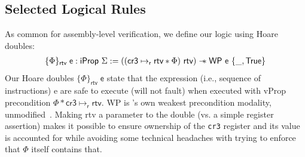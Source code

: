 \subsection{Selected Logical Rules}
\label{sec:selected_rules}
As common for assembly-level verification, we define our logic using Hoare doubles:%
  \[
  \begin{array}{l}
    \{ \Phi \}_\mathsf{ rtv }\;\textsf{e} : \textsf{iProp }\Sigma := 
   ((\textsf{cr3} \mapsto_{\textsf{r}} \textsf{rtv} \ast \Phi) \textsf{ rtv}) \mathrel{-\!\!\ast} \textsf{WP e } \{\_, \textsf{True} \}
    \end{array}
  \]
Our Hoare doubles $\{\Phi\}_\textsf{rtv}\;\textsf{e}$ state that the expression (i.e., sequence of instructions)
\textsf{e} are safe to execute (will not fault)
when executed with \textsf{vProp} precondition $\Phi\ast\textsf{cr3}\mapsto_{\textsf{r}} \textsf{rtv}$.
\textsf{WP} is \iris's own weakest precondition modality, unmodified~\cite{jung2018iris}.
Making \textsf{rtv} a parameter to the double (vs. a simple register assertion)
makes it possible to ensure ownership of the \lstinline|cr3| register and its value is accounted for
while avoiding some technical headaches with trying to enforce that $\Phi$ itself contains that.

